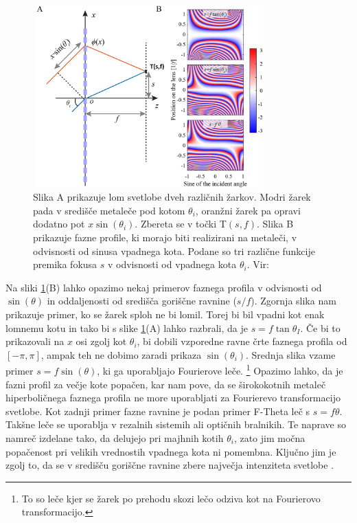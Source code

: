 \documentclass[12pt ]{article}
\begin{document}
  \begin{figure}[H]
     \centering
     \includegraphics[width=9cm, height=7cm]{Slike/Gorisce.jpg}
     \caption{Slika A prikazuje lom svetlobe dveh različnih žarkov. Modri žarek pada v središče metaleče pod kotom $\theta_i$,  oranžni žarek pa opravi dodatno pot $x\sin(\theta_i)$. Zbereta se v točki T$(s, f)$. Slika B prikazuje fazne profile, ki morajo biti realizirani na metaleči, v odvisnosti od sinusa vpadnega kota. Podane so tri različne funkcije premika fokusa $s$ v odvisnosti od vpadnega kota $\theta_i$.  Vir: \cite{Goriscna} }
     \label{Hiperbolicna}
 \end{figure}
Na sliki \ref{Hiperbolicna}(B) lahko opazimo nekaj primerov faznega profila v odvisnosti od $\sin(\theta)$ in oddaljenosti od središča goriščne ravnine ($s/f$).  Zgornja slika nam prikazuje primer, ko se žarek sploh ne bi lomil. Torej bi bil vpadni kot enak lomnemu kotu in tako bi s slike \ref{Hiperbolicna}(A) lahko razbrali, da je $s=f\tan{\theta_I}$. Če bi to prikazovali na $x$ osi zgolj kot $\theta_i$, bi dobili vzporedne ravne črte faznega profila od $[-\pi,\pi]$, ampak teh ne dobimo zaradi prikaza $\sin(\theta_i)$. Srednja slika vzame primer $s=f\sin(\theta)$, ki ga uporabljajo Fourierove leče.\cite{primeri} \footnote{To so leče kjer se žarek po prehodu skozi lečo odziva kot na Fourierovo transformacijo.} Opazimo lahko, da je fazni profil za večje kote popačen, kar nam pove, da se širokokotnih metaleč hiperboličnega faznega profila ne more uporabljati za Fourierevo transformacijo svetlobe. Kot zadnji primer fazne ravnine je podan primer F-Theta leč s $s=f\theta$. Takšne leče se uporablja v rezalnih sistemih ali optičnih bralnikih. Te naprave so namreč izdelane tako, da delujejo pri majhnih kotih $\theta_i$, zato jim močna popačenost pri velikih vrednostih vpadnega kota ni pomembna. Ključno jim je zgolj to, da se v središču goriščne ravnine zbere največja intenziteta svetlobe \cite{F-theta}.\\
 
\end{document}
